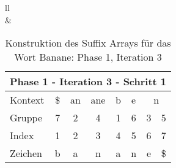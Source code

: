 \begin{table}[H]
\begin{adjustbox}{max width=\textwidth}
\begin{tabular}{ll}
\\
&
\\

\begin{tabular}{lccccccc}
\multicolumn{8}{l}{Phase 1 - Iteration 3 - Schritt 1}                                                                                                                                  \\ \hline
\multicolumn{1}{l|}{Kontext} & \multicolumn{1}{c|}{\$} & \multicolumn{1}{c|}{an} & \multicolumn{1}{c|}{ane} & \multicolumn{1}{c|}{b} & \multicolumn{1}{c|}{e} & \multicolumn{2}{c}{n} \\
\multicolumn{1}{l|}{Gruppe}  & \multicolumn{1}{c|}{7}  & \multicolumn{1}{c|}{2}  & \multicolumn{1}{c|}{4}   & \multicolumn{1}{c|}{1} & \multicolumn{1}{c|}{6} & 3         & 5          \\ \hline
\multicolumn{1}{l|}{Index}   & 1                       & 2                       & 3                        & 4                      & 5                      & 6         & 7          \\
\multicolumn{1}{l|}{Zeichen} & b                       & a                       & n                        & a                      & n                      & e         & \$        
\end{tabular}

\end{tabular}
\end{adjustbox}

\caption[Konstruktion des Suffix Arrays für das Wort Banane: Phase 1, Iteration 3]{Konstruktion des Suffix Arrays für das Wort Banane: Phase 1, Iteration 3}
\label{fig_banane_1_3} 
\end{table}
